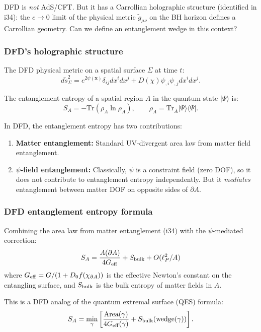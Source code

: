 \documentclass[11pt,a4paper]{article}
\begin{document}
DFD is \emph{not} AdS/CFT. But it has a Carrollian holographic structure (identified in i34): the $c \to 0$ limit of the physical metric $\tilde{g}_{\mu\nu}$ on the BH horizon defines a Carrollian geometry. Can we define an entanglement wedge in this context?

\subsubsection{DFD's holographic structure}

The DFD physical metric on a spatial surface $\Sigma$ at time $t$:
\begin{equation}
d\tilde{s}^2_\Sigma = e^{2\psi(\mathbf{x})}\delta_{ij}dx^i dx^j + D(\chi)\psi_{,i}\psi_{,j}dx^i dx^j.
\end{equation}

The entanglement entropy of a spatial region $A$ in the quantum state $|\Psi\rangle$ is:
\begin{equation}
S_A = -\text{Tr}(\rho_A\ln\rho_A), \qquad \rho_A = \text{Tr}_{\bar{A}}|\Psi\rangle\langle\Psi|.
\end{equation}

In DFD, the entanglement entropy has two contributions:
\begin{enumerate}
\item \textbf{Matter entanglement:} Standard UV-divergent area law from matter field entanglement.
\item \textbf{$\psi$-field entanglement:} Classically, $\psi$ is a constraint field (zero DOF), so it does not contribute to entanglement entropy independently. But it \emph{mediates} entanglement between matter DOF on opposite sides of $\partial A$.
\end{enumerate}

\subsubsection{DFD entanglement entropy formula}

Combining the area law from matter entanglement (i34) with the $\psi$-mediated correction:
\begin{equation}
S_A = \frac{A(\partial A)}{4G_{\rm eff}} + S_{\rm bulk} + O(\ell_P^2/A)
\end{equation}
where $G_{\rm eff} = G/(1 + D_0 f(\chi_{\partial A}))$ is the effective Newton's constant on the entangling surface, and $S_{\rm bulk}$ is the bulk entropy of matter fields in $A$.

This is a DFD analog of the quantum extremal surface (QES) formula:
\begin{equation}
S_A = \min_\gamma\left[\frac{\text{Area}(\gamma)}{4G_{\rm eff}(\gamma)} + S_{\rm bulk}(\text{wedge}(\gamma))\right].
\end{equation}
\end{document}
